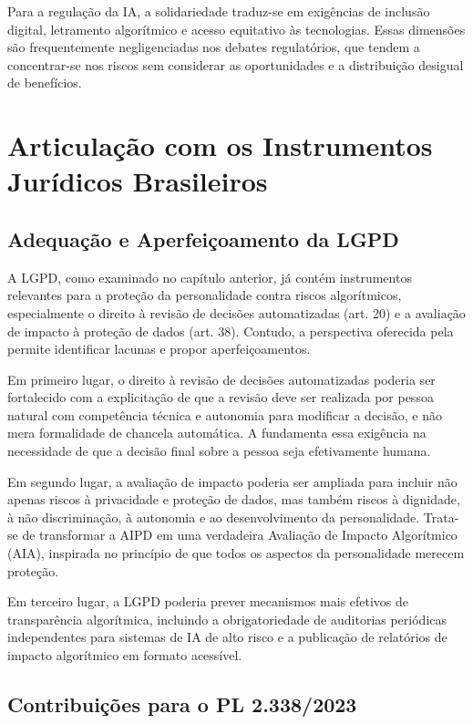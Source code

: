 Para a regulação da IA, a solidariedade traduz-se em exigências de inclusão digital, letramento algorítmico e acesso equitativo às tecnologias. Essas dimensões são frequentemente negligenciadas nos debates regulatórios, que tendem a concentrar-se nos riscos sem considerar as oportunidades e a distribuição desigual de benefícios.

\section{Articulação com os Instrumentos Jurídicos Brasileiros}
\label{sec:articulacao-juridica}

\subsection{Adequação e Aperfeiçoamento da LGPD}
\label{subsec:lgpd-aperfeicoamento}

A LGPD, como examinado no capítulo anterior, já contém instrumentos relevantes para a proteção da personalidade contra riscos algorítmicos, especialmente o direito à revisão de decisões automatizadas (art. 20) e a avaliação de impacto à proteção de dados (art. 38). Contudo, a perspectiva oferecida pela \MH{} permite identificar lacunas e propor aperfeiçoamentos.

Em primeiro lugar, o direito à revisão de decisões automatizadas poderia ser fortalecido com a explicitação de que a revisão deve ser realizada por pessoa natural com competência técnica e autonomia para modificar a decisão, e não mera formalidade de chancela automática. A \MH{} fundamenta essa exigência na necessidade de que a decisão final sobre a pessoa seja efetivamente humana.

Em segundo lugar, a avaliação de impacto poderia ser ampliada para incluir não apenas riscos à privacidade e proteção de dados, mas também riscos à dignidade, à não discriminação, à autonomia e ao desenvolvimento da personalidade. Trata-se de transformar a AIPD em uma verdadeira Avaliação de Impacto Algorítmico (AIA), inspirada no princípio de que todos os aspectos da personalidade merecem proteção.

Em terceiro lugar, a LGPD poderia prever mecanismos mais efetivos de transparência algorítmica, incluindo a obrigatoriedade de auditorias periódicas independentes para sistemas de IA de alto risco e a publicação de relatórios de impacto algorítmico em formato acessível.

\subsection{Contribuições para o PL 2.338/2023}
\label{subsec:contribuicoes-pl}

